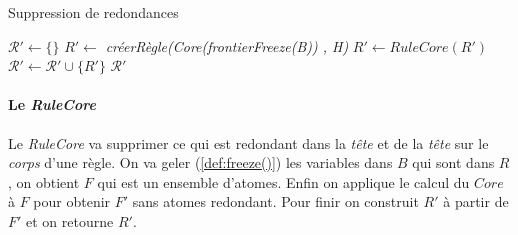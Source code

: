 \begin{algorithm}[H]\label{algo:redondances}
\caption{Suppression de redondances}
\SetAlgoLined
\DontPrintSemicolon
\SetAlgoLined
\DontPrintSemicolon
{}
    $\mathcal{R}' \gets \{\}$\; 
    {
        $R' \gets $ \textit{créerRègle(Core(frontierFreeze(B)) , H)} \;
        $R' \gets RuleCore(R')$\;
        $\mathcal{R'} \gets \mathcal{R'} \cup \{R'\}$\;
    }
    \Return $\mathcal{R}'$
\end{algorithm}
%


\paragraph{Le \textit{RuleCore}}
Le \textit{RuleCore} va supprimer ce qui est redondant dans la \textit{tête} et de la \textit{tête} sur le \textit{corps} d'une règle. On va geler (\ref{def:freeze()}) les variables dans $B$ qui sont dans $R$, on obtient $F$ qui est un ensemble d'atomes. Enfin on applique le calcul du $Core$ à $F$ pour obtenir $F'$ sans atomes redondant. Pour finir on construit $R'$ à partir de $F'$ et on retourne $R'$.
\newline


